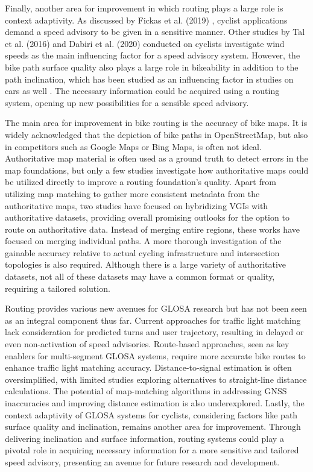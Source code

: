 Finally, another area for improvement in which routing plays a large role is context adaptivity. As discussed by Fickas et al. (2019) \cite{fickas_fast_2019}, cyclist applications demand a speed advisory to be given in a sensitive manner. Other studies by Tal et al. (2016) \cite{tal_vehicular-communications-based_2016} and Dabiri et al. (2020) \cite{dabiri_optimized_2020} conducted on cyclists investigate wind speeds as the main influencing factor for a speed advisory system. However, the bike path surface quality also plays a large role in bikeability \cite{wasserman_evaluating_2019} in addition to the path inclination, which has been studied as an influencing factor in studies on cars as well \cite{zhang_green_2020}. The necessary information could be acquired using a routing system, opening up new possibilities for a sensible speed advisory.

\begin{Summary}
The main area for improvement in bike routing is the accuracy of bike maps. It is widely acknowledged that the depiction of bike paths in OpenStreetMap, but also in competitors such as Google Maps or Bing Maps, is often not ideal. Authoritative map material is often used as a ground truth to detect errors in the map foundations, but only a few studies investigate how authoritative maps could be utilized directly to improve a routing foundation's quality. Apart from utilizing map matching to gather more consistent metadata from the authoritative maps, two studies have focused on hybridizing VGIs with authoritative datasets, providing overall promising outlooks for the option to route on authoritative data. Instead of merging entire regions, these works have focused on merging individual paths. A more thorough investigation of the gainable accuracy relative to actual cycling infrastructure and intersection topologies is also required. Although there is a large variety of authoritative datasets, not all of these datasets may have a common format or quality, requiring a tailored solution.

Routing provides various new avenues for GLOSA research but has not been seen as an integral component thus far. Current approaches for traffic light matching lack consideration for predicted turns and user trajectory, resulting in delayed or even non-activation of speed advisories. Route-based approaches, seen as key enablers for multi-segment GLOSA systems, require more accurate bike routes to enhance traffic light matching accuracy. Distance-to-signal estimation is often oversimplified, with limited studies exploring alternatives to straight-line distance calculations. The potential of map-matching algorithms in addressing GNSS inaccuracies and improving distance estimation is also underexplored. Lastly, the context adaptivity of GLOSA systems for cyclists, considering factors like path surface quality and inclination, remains another area for improvement. Through delivering inclination and surface information, routing systems could play a pivotal role in acquiring necessary information for a more sensitive and tailored speed advisory, presenting an avenue for future research and development.
\end{Summary}

